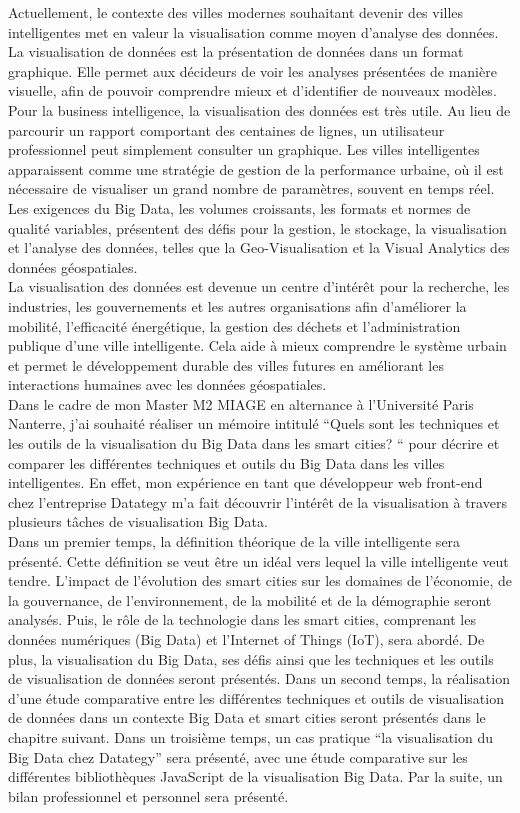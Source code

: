 \documentclass[french, a4paper, 12pt]{report}
\begin{document}
Actuellement, le contexte des villes modernes souhaitant devenir des villes intelligentes met en valeur la visualisation comme moyen d’analyse des données. La visualisation de données est la présentation de données dans un format graphique. Elle permet aux décideurs de voir les analyses présentées de manière visuelle, afin de pouvoir comprendre mieux et d’identifier de nouveaux modèles. Pour la business intelligence, la visualisation des données est très utile. Au lieu de parcourir un rapport comportant des centaines de lignes, un utilisateur professionnel peut simplement consulter un graphique. Les villes intelligentes apparaissent comme une stratégie de gestion de la performance urbaine, où il est nécessaire de visualiser un grand nombre de paramètres, souvent en temps réel. Les exigences du Big Data, les volumes croissants, les formats et normes de qualité variables, présentent des défis pour la gestion, le stockage, la visualisation et l'analyse des données, telles que la Geo-Visualisation et la Visual Analytics des données géospatiales. \\
La visualisation des données est devenue un centre d'intérêt pour la recherche, les industries, les gouvernements et les autres organisations afin d’améliorer la mobilité, l'efficacité énergétique, la gestion des déchets et l'administration publique d'une ville intelligente. Cela aide à mieux comprendre le système urbain et permet le développement durable des villes futures en améliorant les interactions humaines avec les données géospatiales.\\

Dans le cadre de mon Master M2 MIAGE en alternance à l’Université Paris Nanterre, j’ai souhaité réaliser un mémoire intitulé “Quels sont les techniques et les outils de la visualisation du Big Data dans les smart cities? “ pour décrire et comparer les différentes techniques et outils du Big Data dans les villes intelligentes. En effet, mon expérience en tant que développeur web front-end chez l’entreprise Datategy m’a fait découvrir l’intérêt de la visualisation à travers plusieurs tâches de visualisation Big Data.\\

Dans un premier temps, la définition théorique de la ville intelligente sera présenté. Cette définition se veut être un idéal vers lequel la ville intelligente veut tendre. L’impact de l'évolution des smart cities sur les domaines de l’économie, de la gouvernance, de l’environnement, de la mobilité et de la démographie seront analysés. Puis, le rôle de la technologie dans les smart cities, comprenant les données numériques (Big Data) et l’Internet of Things (IoT), sera abordé. De plus, la visualisation du Big Data, ses défis ainsi que les techniques et les outils de visualisation de données seront présentés. 
Dans un second temps, la réalisation d’une étude comparative entre les différentes techniques et outils de visualisation de données dans un contexte Big Data et smart cities seront présentés dans le chapitre suivant.
Dans un troisième temps, un cas pratique “la visualisation du Big Data chez Datategy” sera présenté, avec une étude comparative sur les différentes bibliothèques JavaScript de la visualisation Big Data. Par la suite, un bilan professionnel et personnel sera présenté. 
\end{document}
